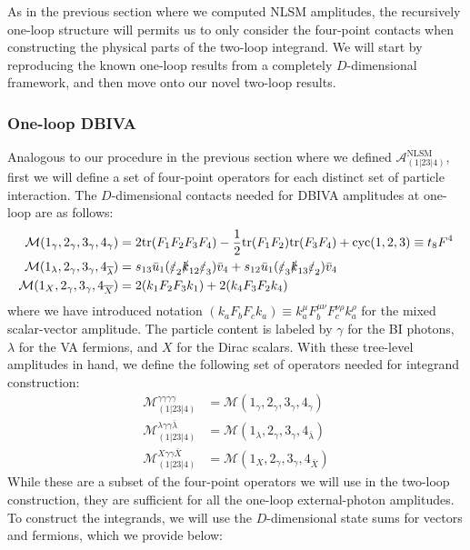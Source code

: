 \documentclass[11pt,letter]{article}
\begin{document}
As in the previous section where we computed NLSM amplitudes, the recursively one-loop structure will permits us to only consider the four-point contacts when constructing the physical parts of the two-loop integrand. We will start by reproducing the known one-loop results from a completely $D$-dimensional framework, and then move onto our novel two-loop results. 

\subsubsection{One-loop DBIVA}\label{sec:1loopDBIU}
Analogous to our procedure in the previous section where we defined $\mathcal{A}^{\text{NLSM}}_{(1|23|4)}$, first we will define a set of four-point operators for each distinct set of particle interaction. The $D$-dimensional contacts needed for DBIVA amplitudes at one-loop are as follows:
\begin{align}
\mathcal{M}(1_\gamma,2_\gamma,3_\gamma,4_\gamma) &= 2\text{tr}(F_1F_2F_3F_4) - \frac{1}{2}\text{tr}(F_1F_2)\text{tr}(F_3F_4)+\text{cyc}(1,2,3) \equiv t_8 F^4
\\
\mathcal{M}(1_\lambda,2_\gamma,3_\gamma,4_{\overline{\lambda}}) &= s_{13}\bar{u}_1(\slashed{\varepsilon}_2\slashed{k}_{12}\slashed{\varepsilon}_3) \bar{v}_4 + s_{12}\bar{u}_1(\slashed{\varepsilon}_3\slashed{k}_{13}\slashed{\varepsilon}_2) \bar{v}_4
\\
\mathcal{M}(1_X,2_\gamma,3_\gamma,4_{\overline{X}}) &= 2 (k_1 F_2 F_3 k_1) +2 (k_4 F_3 F_2 k_4)
\end{align}
where we have introduced notation $(k_a F_b F_c k_a) \equiv k_a^\mu F^{\mu\nu}_bF^{\nu\rho}_c k_a^\rho$ for the mixed scalar-vector amplitude. The particle content is labeled by $\gamma$ for the BI photons, $\lambda$ for the VA fermions, and $X$ for the Dirac scalars. With these tree-level amplitudes in hand, we define the following set of operators needed for integrand construction:
\begin{align}
\mathcal{M}^{\gamma \gamma \gamma \gamma }_{(1|23|4)} &= \mathcal{M}(1_\gamma,2_\gamma,3_\gamma,4_\gamma)   
\\
\mathcal{M}^{\lambda \gamma \gamma \bar{\lambda} }_{(1|23|4)} &= \mathcal{M}(1_\lambda,2_\gamma,3_\gamma,4_{\overline{\lambda}})
\\
\mathcal{M}^{X \gamma \gamma \bar{X} }_{(1|23|4)} &= \mathcal{M}(1_X,2_\gamma,3_\gamma,4_{\overline{X}}) 
\end{align}
While these are a subset of the four-point operators we will use in the two-loop construction, they are sufficient for all the one-loop external-photon amplitudes. To construct the integrands, we will use the $D$-dimensional state sums for vectors and fermions, which we provide below:
\end{document}
